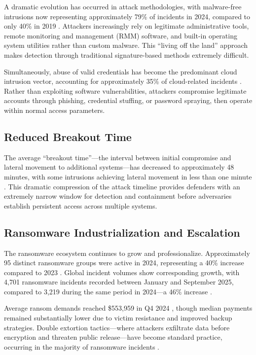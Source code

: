 A dramatic evolution has occurred in attack methodologies, with malware-free intrusions now representing approximately 79\% of incidents in 2024, compared to only 40\% in 2019 \cite{crowdstrike2024}. Attackers increasingly rely on legitimate administrative tools, remote monitoring and management (RMM) software, and built-in operating system utilities rather than custom malware. This ``living off the land'' approach makes detection through traditional signature-based methods extremely difficult.

Simultaneously, abuse of valid credentials has become the predominant cloud intrusion vector, accounting for approximately 35\% of cloud-related incidents \cite{crowdstrike2024}. Rather than exploiting software vulnerabilities, attackers compromise legitimate accounts through phishing, credential stuffing, or password spraying, then operate within normal access parameters.

\subsection{Reduced Breakout Time}

The average ``breakout time''---the interval between initial compromise and lateral movement to additional systems---has decreased to approximately 48 minutes, with some intrusions achieving lateral movement in less than one minute \cite{crowdstrike2024}. This dramatic compression of the attack timeline provides defenders with an extremely narrow window for detection and containment before adversaries establish persistent access across multiple systems.

\subsection{Ransomware Industrialization and Escalation}

The ransomware ecosystem continues to grow and professionalize. Approximately 95 distinct ransomware groups were active in 2024, representing a 40\% increase compared to 2023 \cite{brightdefense2025}. Global incident volumes show corresponding growth, with 4,701 ransomware incidents recorded between January and September 2025, compared to 3,219 during the same period in 2024---a 46\% increase \cite{industrialcyber2025}.

Average ransom demands reached \$553,959 in Q4 2024 \cite{brightdefense2025}, though median payments remained substantially lower due to victim resistance and improved backup strategies. Double extortion tactics---where attackers exfiltrate data before encryption and threaten public release---have become standard practice, occurring in the majority of ransomware incidents \cite{veeam2025}.

